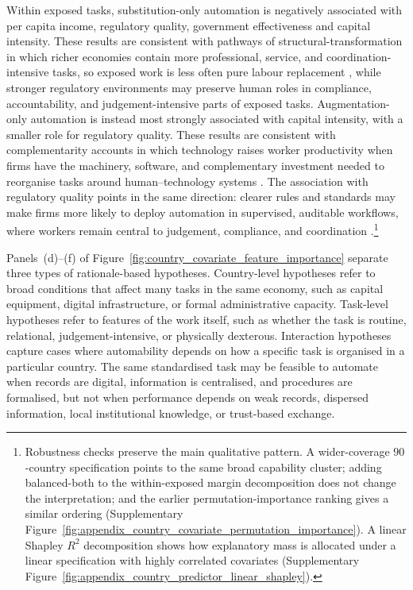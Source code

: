 \documentclass[11pt]{article}
\begin{document}
Within exposed tasks, substitution-only automation is negatively associated with per capita income, regulatory quality, government effectiveness and capital intensity. These results are consistent with pathways of structural-transformation in which richer economies contain more professional, service, and coordination-intensive tasks, so exposed work is less often pure labour replacement \citep{Rodrik2016PrematureDeindustrializationJEG,CaunedoKellerShin2021,LewandowskiMadonPark2025DevelopmentStages}, while stronger regulatory environments may preserve human roles in compliance, accountability, and judgement-intensive parts of exposed tasks. Augmentation-only automation is instead most strongly associated with capital intensity, with a smaller role for regulatory quality. These results are consistent with complementarity accounts in which technology raises worker productivity when firms have the machinery, software, and complementary investment needed to reorganise tasks around human--technology systems \citep{BresnahanBrynjolfssonHitt2002,RaischKrakowski2021AutomationAugmentation}. The association with regulatory quality points in the same direction: clearer rules and standards may make firms more likely to deploy automation in supervised, auditable workflows, where workers remain central to judgement, compliance, and coordination \citep{VaccaroAlmaatouqMalone2024HumanAIUseful,BabinaFedykHeHodson2024AIFirmGrowth}.\footnote{Robustness checks preserve the main qualitative pattern. A wider-coverage $90$-country specification points to the same broad capability cluster; adding balanced-both to the within-exposed margin decomposition does not change the interpretation; and the earlier permutation-importance ranking gives a similar ordering (Supplementary Figure~\ref{fig:appendix_country_covariate_permutation_importance}). A linear Shapley $R^2$ decomposition shows how explanatory mass is allocated under a linear specification with highly correlated covariates (Supplementary Figure~\ref{fig:appendix_country_predictor_linear_shapley}).}

Panels~(d)--(f) of Figure~\ref{fig:country_covariate_feature_importance} separate three types of rationale-based hypotheses. Country-level hypotheses refer to broad conditions that affect many tasks in the same economy, such as capital equipment, digital infrastructure, or formal administrative capacity. Task-level hypotheses refer to features of the work itself, such as whether the task is routine, relational, judgement-intensive, or physically dexterous. Interaction hypotheses capture cases where automability depends on how a specific task is organised in a particular country. The same standardised task may be feasible to automate when records are digital, information is centralised, and procedures are formalised, but not when performance depends on weak records, dispersed information, local institutional knowledge, or trust-based exchange.
\end{document}
